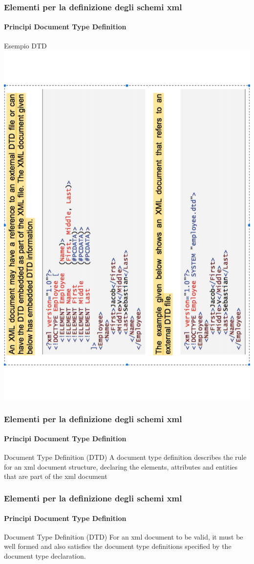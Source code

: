 \begin{frame}
    \frametitle{Elementi per la definizione degli schemi xml}
    \framesubtitle{Principi Document Type Definition}
    \addtocounter{nframe}{1}

    \begin{block}{Esempio DTD}
        \includegraphics[width=.5\textwidth]{imgs/dtd_1.pdf}
    \end{block}
\end{frame}

\begin{frame}
    \frametitle{Elementi per la definizione degli schemi xml}
    \framesubtitle{Principi Document Type Definition}
    \addtocounter{nframe}{1}

    \begin{block}{Document Type Definition (DTD)}
        A document type definition describes the rule for an xml document structure, declaring the elements, attributes and entities that are part of the xml document
    \end{block}

\end{frame}

\begin{frame}
    \frametitle{Elementi per la definizione degli schemi xml}
    \framesubtitle{Principi Document Type Definition}
    \addtocounter{nframe}{1}

    \begin{block}{Document Type Definition (DTD)}
         For an xml document to be valid, it must be well formed and also satisfies the document type definitions specified by the document type declaration.
    \end{block}
\end{frame}

